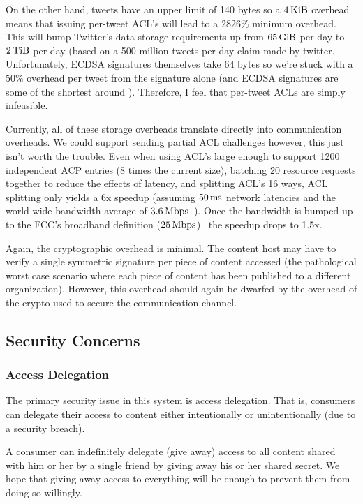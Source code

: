 \documentclass[pdftex,12pt,a4papaer]{article}
\begin{document}
On the other hand, tweets have an upper limit of 140 bytes so a $\unit[4]{KiB}$
overhead means that issuing per-tweet ACL's will lead to a $2826\%$ minimum
overhead. This will bump Twitter's data storage requirements up from
$\unit[65]{GiB}$ per day to $\unit[2]{TiB}$ per day (based on a 500 million
tweets per day claim made by twitter\cite{twitter}. Unfortunately, ECDSA
signatures themselves take 64 bytes so we're stuck with a $50\%$ overhead per
tweet from the signature alone (and ECDSA signatures are some of the shortest
around ). Therefore, I feel that per-tweet ACLs are simply
infeasible.

Currently, all of these storage overheads translate directly into communication
overheads. We could support sending partial ACL challenges however, this just
isn't worth the trouble. Even when using ACL's large enough to support 1200
independent ACP entries (8 times the current size), batching 20 resource
requests together to reduce the effects of latency, and splitting ACL's 16 ways,
ACL splitting only yields a 6x speedup (assuming $\unit[50]{ms}$ network
latencies and the world-wide bandwidth average of
$\unit[3.6]{Mbps}$~\cite{akamai}). Once the bandwidth is bumped up to the FCC's
broadband definition ($\unit[25]{Mbps}$)~\cite{fcc} the speedup drops to 1.5x.

Again, the cryptographic overhead is minimal. The content host may have to
verify a single symmetric signature per piece of content accessed (the
pathological worst case scenario where each piece of content has been published
to a different organization). However, this overhead should again be dwarfed by
the overhead of the crypto used to secure the communication channel.

\subsection{Security Concerns}

\subsubsection{Access Delegation}

The primary security issue in this system is access delegation. That is,
consumers can delegate their access to content either intentionally or
unintentionally (due to a security breach).

A consumer can indefinitely delegate (give away) access to all content shared
with him or her by a single friend by giving away his or her shared secret. We
hope that giving away access to everything will be enough to prevent them from
doing so willingly.
\end{document}
